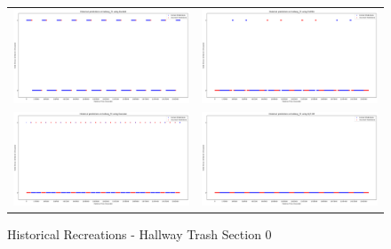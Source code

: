\begin{figure}
  \begin{tabular}{cc}
    {\includegraphics[width = 3in]{images/results/Historical_hallway_T0_Duckett.png}} &
    {\includegraphics[width = 3in]{images/results/Historical_hallway_T0_FreMEn.png}} \\
    {\includegraphics[width = 3in]{images/results/Historical_hallway_T0_Gaussian.png}} &
    {\includegraphics[width = 3in]{images/results/Historical_hallway_T0_HyT-EM.png}} \\
  \end{tabular}
  \caption{Historical Recreations - Hallway Trash Section 0}
\end{figure}

